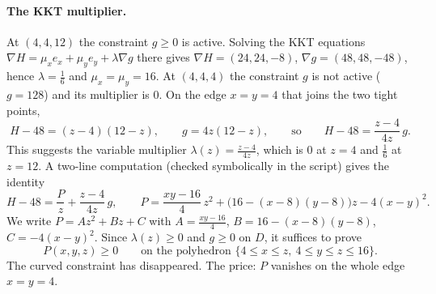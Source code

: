 \documentclass[11pt,openany]{book}
\theoremstyle{plain}
\theoremstyle{definition}
\theoremstyle{remark}
\begin{document}
\paragraph{The KKT multiplier.} At $(4,4,12)$ the constraint $g\ge0$ is active. Solving the KKT
equations $\nabla H=\mu_x e_x+\mu_ye_y+\lambda\nabla g$ there gives $\nabla H=(24,24,-8)$,
$\nabla g=(48,48,-48)$, hence $\lambda=\frac16$ and $\mu_x=\mu_y=16$. At $(4,4,4)$ the constraint $g$ is not
active ($g=128$) and its multiplier is $0$. On the edge $x=y=4$ that joins the two tight points,
\[
  H-48=(z-4)(12-z),\qquad g=4z(12-z),\qquad\text{so}\qquad H-48=\frac{z-4}{4z}\,g .
\]
This suggests the variable multiplier $\lambda(z)=\frac{z-4}{4z}$, which is $0$ at $z=4$ and $\frac16$ at
$z=12$. A two-line computation (checked symbolically in the script) gives the identity
\begin{equation}\label{COMP:eq:cert}
  H-48=\frac{P}{z}+\frac{z-4}{4z}\,g,\qquad
  P=\frac{xy-16}4\,z^2+\big(16-(x-8)(y-8)\big)z-4(x-y)^2 .
\end{equation}
We write $P=Az^2+Bz+C$ with $A=\frac{xy-16}4$, $B=16-(x-8)(y-8)$, $C=-4(x-y)^2$. Since $\lambda(z)\ge0$ and
$g\ge0$ on $D$, it suffices to prove
\begin{equation}\label{COMP:eq:Pclaim}
  P(x,y,z)\ge0\qquad\text{on the polyhedron } \{4\le x\le z,\ 4\le y\le z\le16\}.
\end{equation}
The curved constraint has disappeared. The price: $P$ vanishes on the whole edge $x=y=4$.
\end{document}
